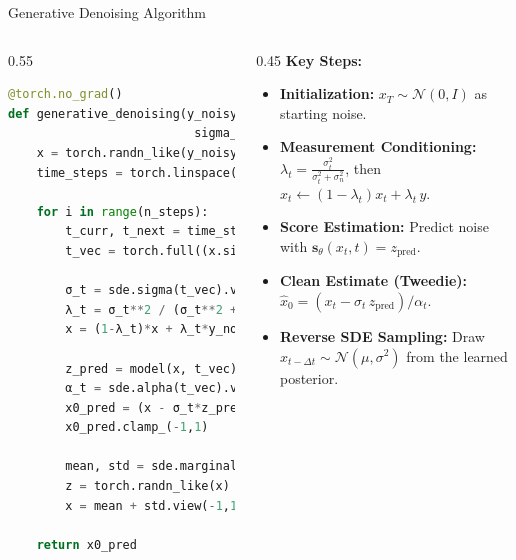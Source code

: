 \documentclass[10pt]{beamer}
\begin{document}
\begin{frame}[fragile]{Generative Denoising Algorithm}
  \begin{columns}[T]
    \begin{column}{0.55\textwidth}
      \small
      \begin{lstlisting}[language=Python,
                            basicstyle=\ttfamily\tiny,
                            numbers=none,
                            frame=single]
@torch.no_grad()
def generative_denoising(y_noisy, model, sde,
                          sigma_n, n_steps, eps=1e-5):
    x = torch.randn_like(y_noisy)
    time_steps = torch.linspace(1.0, eps, n_steps+1)

    for i in range(n_steps):
        t_curr, t_next = time_steps[i], time_steps[i+1]
        t_vec = torch.full((x.size(0),), t_curr, device=x.device)

        σ_t = sde.sigma(t_vec).view(-1,1,1,1)
        λ_t = σ_t**2 / (σ_t**2 + sigma_n**2)
        x = (1-λ_t)*x + λ_t*y_noisy

        z_pred = model(x, t_vec)
        α_t = sde.alpha(t_vec).view(-1,1,1,1)
        x0_pred = (x - σ_t*z_pred) / α_t
        x0_pred.clamp_(-1,1)

        mean, std = sde.marginal_prob(x0_pred, t_next)
        z = torch.randn_like(x) if i < n_steps-1 else 0
        x = mean + std.view(-1,1,1,1)*z

    return x0_pred
      \end{lstlisting}
    \end{column}

    \begin{column}{0.45\textwidth}
      \textbf{Key Steps:}
        \begin{itemize}\small\itemsep0.5em
    \item \textbf{Initialization:}
      $\displaystyle x_T\sim\mathcal{N}(0,I)$ as starting noise.
    \item \textbf{Measurement Conditioning:}
      $\lambda_t=\frac{\sigma_t^2}{\sigma_t^2+\sigma_n^2}$,
      then $x_t\leftarrow(1-\lambda_t)x_t+\lambda_t\,y$.
    \item \textbf{Score Estimation:}
      Predict noise with $\mathbf{s}_\theta(x_t,t)=z_\text{pred}$.
    \item \textbf{Clean Estimate (Tweedie):}
      $\hat x_0=(x_t-\sigma_t\,z_\text{pred})/\alpha_t$.
    \item \textbf{Reverse SDE Sampling:}
      Draw $x_{t-\Delta t}\sim\mathcal{N}(\mu,\sigma^2)$ from the learned posterior.
    \end{itemize}
    \end{column}
  \end{columns}
\end{frame}
\end{document}
